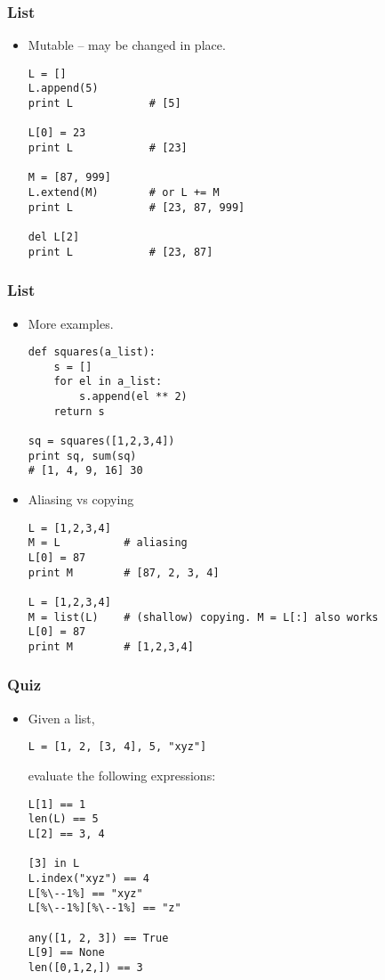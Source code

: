 \documentclass{beamer}
\begin{document}
\begin{frame}[fragile]
\frametitle{List}
\begin{itemize}
\item Mutable -- may be changed in place.
\begin{lstlisting}
L = []
L.append(5)
print L            # [5]

L[0] = 23
print L            # [23]

M = [87, 999]
L.extend(M)        # or L += M
print L            # [23, 87, 999]

del L[2]
print L            # [23, 87]
\end{lstlisting}
\end{itemize}
\end{frame}

\begin{frame}[fragile]
\frametitle{List}
\begin{itemize}
\item<1-> More examples.
\begin{lstlisting}
def squares(a_list):
    s = []
    for el in a_list:
        s.append(el ** 2)
    return s

sq = squares([1,2,3,4])
print sq, sum(sq)
# [1, 4, 9, 16] 30
\end{lstlisting}
\item<2-> Aliasing vs copying
\begin{lstlisting}
L = [1,2,3,4]
M = L          # aliasing
L[0] = 87
print M        # [87, 2, 3, 4]

L = [1,2,3,4]
M = list(L)    # (shallow) copying. M = L[:] also works
L[0] = 87
print M        # [1,2,3,4]
\end{lstlisting}
\end{itemize}
\end{frame}

\begin{frame}[fragile]
\frametitle{Quiz}
\begin{itemize}
\item Given a list,
\begin{lstlisting}
L = [1, 2, [3, 4], 5, "xyz"]
\end{lstlisting}
evaluate the following expressions:
\begin{lstlisting}[escapechar=\%]
L[1] == 1
len(L) == 5
L[2] == 3, 4

[3] in L
L.index("xyz") == 4
L[%\--1%] == "xyz"
L[%\--1%][%\--1%] == "z"

any([1, 2, 3]) == True
L[9] == None
len([0,1,2,]) == 3
\end{lstlisting}
\end{itemize}
\end{frame}
\end{document}
